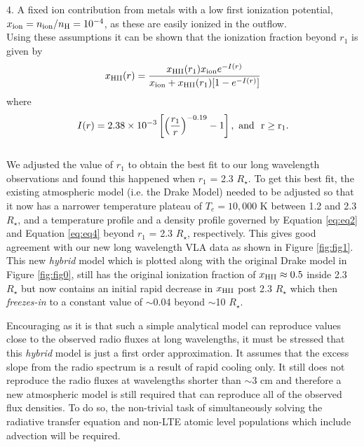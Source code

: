 \documentclass[iop]{emulateapj}
\begin{document}
4. A fixed ion contribution from metals with a low first ionization potential, $x_{\rm{ion}}=n_{\rm{ion}}/n_{\rm{H}}=10^{-4}$, as these are easily ionized in the outflow.\\
Using these assumptions it can be shown that the ionization fraction beyond $r_{1}$ is given by \citep{1986ApJ...306..605G}
\begin{equation}
x_{\rm{HII}}(r)= \frac{x_{\rm{HII}}(r_1)x_{\rm{ion}}e^{-I(r)}}{x_{\rm{ion}}+x_{\rm{HII}}(r_1)[1 - e^{-I(r)}]}
\label{eq:eq4}
\end{equation}
where
\begin{equation}
I(r) = 2.38 \times 10^{-3} \left[\left( \frac{r_{1}}{r}\right)^{-0.19} -1 \right], \ \rm{and} \ \  r \geq r_{1}.
\label{eq:eq5}
\end{equation}
\\

We adjusted the value of $r_{1}$ to obtain the best fit to our long wavelength observations and found this happened when $r_{1}$ = 2.3 $R_{\star}$. To get this best fit, the existing atmospheric model (i.e. the Drake Model) needed to be adjusted so that it now has a narrower temperature plateau of $T_e = 10,000$ K between 1.2 and 2.3 $R_{\star}$, and a temperature profile and a density profile governed by Equation \ref{eq:eq2} and Equation \ref{eq:eq4} beyond $r_{1}$ = 2.3 $R_{\star}$, respectively. This gives good agreement with our new long wavelength VLA data as shown in Figure \ref{fig:fig1}. This new \textit{hybrid} model which is plotted along with the original Drake model in Figure \ref{fig:fig0}, still has the original ionization fraction of $x_{\rm{HII}} \approx 0.5$ inside 2.3 $R_{\star}$ but now contains an initial rapid decrease in $x_{\rm{HII}}$ post 2.3 $R_{\star}$ which then \textit{freezes-in} to a constant value of $\sim$0.04 beyond $\sim$10 $R_{\star}$.

Encouraging as it is that such a simple analytical model can reproduce values close to the observed radio fluxes at long wavelengths, it must be stressed that this \textit{hybrid} model is just a first order approximation. It assumes that the excess slope from the radio spectrum is a result of rapid cooling only. It still does not reproduce the radio fluxes at wavelengths shorter than $\sim$3 cm and therefore a new atmospheric model is still required that can reproduce all of the observed flux densities. To do so, the non-trivial task of simultaneously solving the radiative transfer equation and non-LTE atomic level populations which include advection will be required.
\end{document}
